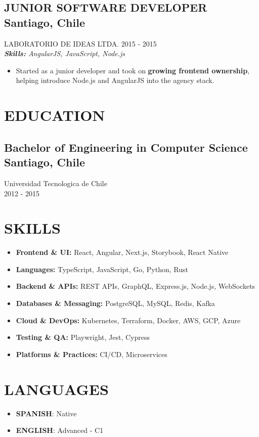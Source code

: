 \documentclass{article}
\newcommand{\SubHeading}[1]{
   \subsection*{#1}\vspace{-0.5em}
}
\newcommand{\WorkExperience}[2]{
   \subsection*{#1}
   \vspace{-1em}
   \uppercase{#2}
}
\newcommand{\Skills}[1]{
   \textit{\textbf{Skills:} #1}
}
\begin{document}
\WorkExperience{JUNIOR SOFTWARE DEVELOPER \hfill Santiago, Chile}{Laboratorio de Ideas Ltda. \hfill 2015 {-} 2015} \\
\Skills{AngularJS, JavaScript, Node.js}
\begin{itemize}
	\item Started as a junior developer and took on \textbf{growing frontend ownership}, helping introduce Node.js and AngularJS into the agency stack.
\end{itemize}

\section*{EDUCATION}
\SubHeading{Bachelor of Engineering in Computer Science \hfill Santiago, Chile}
Universidad Tecnologica de Chile \\[0.1em]
2012 {-} 2015

\section*{SKILLS}
\begin{itemize}
	\item \textbf{Frontend \& UI:} React, Angular, Next.js, Storybook, React Native
	\item \textbf{Languages:} TypeScript, JavaScript, Go, Python, Rust
	\item \textbf{Backend \& APIs:} REST APIs, GraphQL, Express.js, Node.js, WebSockets
	\item \textbf{Databases \& Messaging:} PostgreSQL, MySQL, Redis, Kafka
	\item \textbf{Cloud \& DevOps:} Kubernetes, Terraform, Docker, AWS, GCP, Azure
	\item \textbf{Testing \& QA:} Playwright, Jest, Cypress
	\item \textbf{Platforms \& Practices:} CI/CD, Microservices
\end{itemize}

\section*{LANGUAGES}
\begin{itemize}[left=0pt]
	\item \textbf{SPANISH}: Native
	\item \textbf{ENGLISH}: Advanced {-} C1
\end{itemize}
\end{document}
